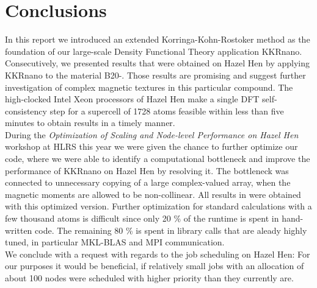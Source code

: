 \documentclass [a4paper, 12pt]{article}
\begin{document}
\section{Conclusions}
In this report we introduced an extended Korringa-Kohn-Rostoker method as the foundation of our large-scale
Density Functional Theory application KKRnano. 
Consecutively, we presented results that were obtained on Hazel Hen 
by applying KKRnano to the material B20-.
Those results are promising and suggest further investigation
of complex magnetic textures in this particular compound.
The high-clocked Intel Xeon processors of Hazel Hen
make a single DFT self-consistency step for a supercell of 1728 atoms feasible within 
less than five minutes
to obtain results in a timely manner.\\

During the
\textit{Optimization of Scaling and Node-level Performance on Hazel Hen} workshop at HLRS this year we were
given the chance to further optimize our code, where we were able to identify a computational bottleneck and
improve the performance of KKRnano on Hazel Hen by resolving it. The bottleneck was
connected to unnecessary copying of a large complex-valued array, when the magnetic moments are allowed to be
non-collinear.
All results in  were
obtained with this optimized version.
Further optimization for standard calculations with a few thousand atoms 
is difficult since only 20 \% of the runtime is spent in hand-written code. The remaining 80 \% is spent in
library calls that are aleady highly tuned, in particular MKL-BLAS and MPI communication.
\\
We conclude with a request with regards to the job scheduling on Hazel Hen:
For our purposes it would be beneficial, if relatively small jobs with an allocation of
about 100 nodes 
were scheduled with higher priority than they currently are.
\end{document}
